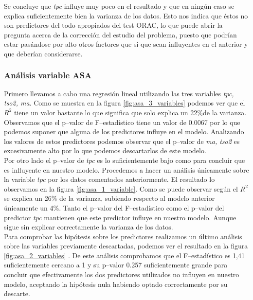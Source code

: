 \documentclass{article}
\begin{document}
Se concluye que \textit{tpc} influye muy poco en el resultado y que en ningún caso se explica suficientemente bien la varianza de los datos. Esto nos indica que éstos no son predictores del todo apropiados del test ORAC, lo que puede abrir la pregunta acerca de la corrección del estudio del problema, puesto que podrían estar pasándose por alto otros factores que si que sean influyentes en el anterior y que deberían considerarse.


\subsubsection{Análisis variable ASA}

Primero llevamos a cabo una regresión lineal utilizando las tres variables \textit{tpc, tso2, ma}. Como se muestra en la figura \ref{fig:asa_3_variables} podemos ver que el $R^{2}$ tiene un valor bastante lo que significa que solo explica un 22\%de la varianza. Observamos que el p--valor de F--estadístico tiene un valor de 0.0067 por lo que podemos suponer que alguna de los predictores influye en el modelo. Analizando los valores de estos predictores podemos observar que el p--valor de \textit{ma, tso2} es excesivamente alto por lo que podemos descartarlos de este modelo. \\

Por otro lado el p--valor de \textit{tpc} es lo suficientemente bajo como para concluir que es influyente en nuestro modelo. 
Procedemos a hacer un análisis únicamente sobre la variable \textit{tpc} por los datos comentados anteriormente. El resultado lo observamos en la figura \ref{fig:asa_1_variable}. Como se puede observar según el $R^{2}$ se explica un 26\% de la varianza, subiendo respecto al modelo anterior únicamente un 4\%. Tanto el p--valor del F--estadístico como el p--valor del predictor \textit{tpc} mantienen que este predictor influye en nuestro modelo. Aunque sigue sin explicar correctamente la varianza de los datos. \\

Para comprobar las hipótesis sobre los predictores realizamos un último análisis sobre las variables previamente descartadas, podemos ver el resultado en la figura \ref{fig:asa_2_variables} . De este análisis comprobamos que el F--estadístico es 1,41 suficientemente cercano a 1 y su p--valor 0.257 suficientemente grande para concluir que efectivamente los dos predictores utilizados no influyen en nuestro modelo, aceptando la hipótesis nula habiendo optado correctamente por su descarte.\\
\end{document}
